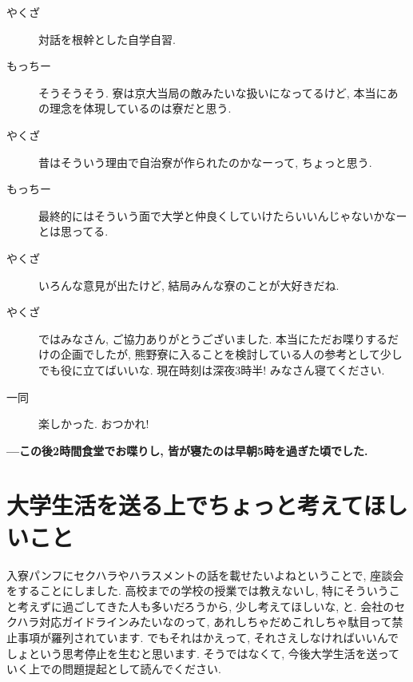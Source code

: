 \documentclass[10pt,b5jsbook,dvips,dvipdfmx,openany]{jsbook}
\theoremstyle{definition}
\begin{document}
\begin{description}
		\item[やくざ]対話を根幹とした自学自習.
		\item[もっちー]そうそうそう. 寮は京大当局の敵みたいな扱いになってるけど, 本当にあの理念を体現しているのは寮だと思う.
		\item[やくざ]昔はそういう理由で自治寮が作られたのかなーって, ちょっと思う.
		\item[もっちー]最終的にはそういう面で大学と仲良くしていけたらいいんじゃないかなーとは思ってる.
		\item[やくざ]いろんな意見が出たけど, 結局みんな寮のことが大好きだね.
		\item[やくざ]ではみなさん, ご協力ありがとうございました. 本当にただお喋りするだけの企画でしたが, 熊野寮に入ることを検討している人の参考として少しでも役に立てばいいな. 現在時刻は深夜3時半! みなさん寝てください.
		\item[ 一同 ]楽しかった. おつかれ!
		\end{description}
		\textbf{---この後2時間食堂でお喋りし, 皆が寝たのは早朝5時を過ぎた頃でした. }
\normalsize

		\section{大学生活を送る上でちょっと考えてほしいこと}

		 入寮パンフにセクハラやハラスメントの話を載せたいよねということで, 座談会をすることにしました. 高校までの学校の授業では教えないし, 特にそういうこと考えずに過ごしてきた人も多いだろうから, 少し考えてほしいな, と. 会社のセクハラ対応ガイドラインみたいなのって, あれしちゃだめこれしちゃ駄目って禁止事項が羅列されています. でもそれはかえって, それさえしなければいいんでしょという思考停止を生むと思います. そうではなくて, 今後大学生活を送っていく上での問題提起として読んでください.
		 
\end{document}
